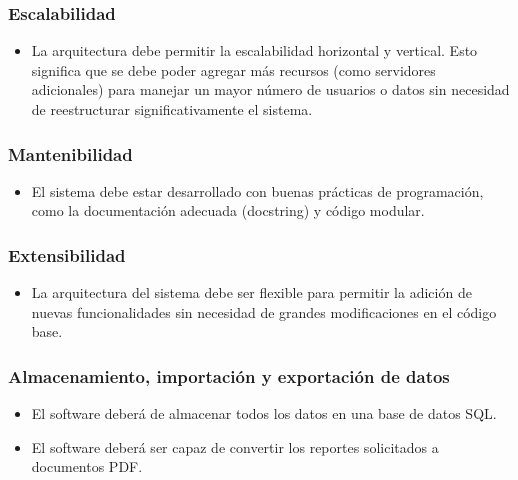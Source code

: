 \documentclass{report}
\begin{document}
            \subsubsection*{Escalabilidad}
            \begin{itemize}
                \item La arquitectura debe permitir la escalabilidad horizontal y vertical. Esto significa que se 
                debe poder agregar más recursos (como servidores adicionales) para manejar un mayor número de 
                usuarios o datos sin necesidad de reestructurar significativamente el sistema.
            \end{itemize}
        
            \subsubsection*{Mantenibilidad}
            \begin{itemize}
                \item El sistema debe estar desarrollado con buenas prácticas de programación, como la documentación 
                adecuada (docstring) y código modular.
            \end{itemize}
        
            \subsubsection*{Extensibilidad}
            \begin{itemize}
                \item La arquitectura del sistema debe ser flexible para permitir la adición de nuevas funcionalidades 
                sin necesidad de grandes modificaciones en el código base.
            \end{itemize}
        
            \subsubsection*{Almacenamiento, importación y exportación de datos}
            \begin{itemize}
                \item El software deberá de almacenar todos los datos en una base de datos SQL.
                \item El software deberá ser capaz de convertir los reportes solicitados a documentos PDF.
            \end{itemize}
\end{document}
